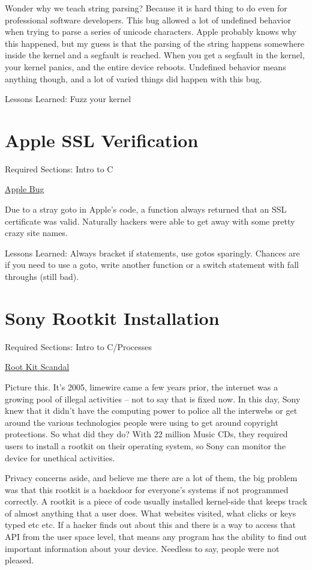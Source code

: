 Wonder why we teach string parsing? Because it is hard thing to do even for professional software developers. This bug allowed a lot of undefined behavior when trying to parse a series of unicode characters. Apple probably knows why this happened, but my guess is that the parsing of the string happens somewhere inside the kernel and a segfault is reached. When you get a segfault in the kernel, your kernel panics, and the entire device reboots. Undefined behavior means anything though, and a lot of varied things did happen with this bug.

Lessons Learned: Fuzz your kernel

\section{Apple SSL Verification}

Required Sections: Intro to C

\href{https://en.wikipedia.org/wiki/Unreachable_code#Examples}{Apple Bug}


Due to a stray goto in Apple's code, a function always returned that an SSL certificate was valid. Naturally hackers were able to get away with some pretty crazy site names.

Lessons Learned: Always bracket if statements, use gotos sparingly. Chances are if you need to use a goto, write another function or a switch statement with fall throughs (still bad).

\section{Sony Rootkit Installation}

Required Sections: Intro to C/Processes

\href{https://en.wikipedia.org/wiki/Sony_BMG_copy_protection_rootkit_scandal}{Root Kit Scandal}

Picture this. It's 2005, limewire came a few years prior, the internet was a growing pool of illegal activities -- not to say that is fixed now. In this day, Sony knew that it didn't have the computing power to police all the interwebs or get around the various technologies people were using to get around copyright protections. So what did they do? With 22 million Music CDs, they required users to install a rootkit on their operating system, so Sony can monitor the device for unethical activities.

Privacy concerns aside, and believe me there are a lot of them, the big problem was that this rootkit is a backdoor for everyone's systems if not programmed correctly. A rootkit is a piece of code usually installed kernel-side that keeps track of almost anything that a user does. What websites visited, what clicks or keys typed etc etc. If a hacker finds out about this and there is a way to access that API from the user space level, that means any program has the ability to find out important information about your device. Needless to say, people were not pleased.

